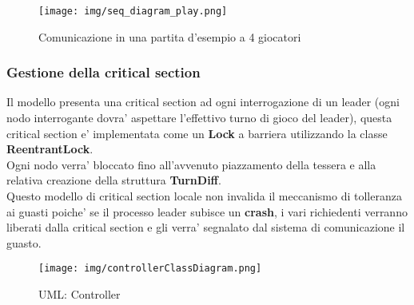 \begin{figure}[H]
	\centering
	\texttt{[image: img/seq\_diagram\_play.png]}
	\caption{Comunicazione in una partita d'esempio a 4 giocatori}
	\label{img:sequence}
\end{figure}

\subsubsection{Gestione della critical section}
	Il modello presenta una critical section ad ogni interrogazione di un leader
	(ogni nodo interrogante dovra' aspettare l'effettivo turno
	di gioco del leader), questa critical section e' implementata come un
	\textbf{Lock} a barriera utilizzando la classe \textbf{ReentrantLock}.\\
	Ogni nodo verra' bloccato fino all'avvenuto piazzamento della tessera e
	alla relativa creazione della struttura \textbf{TurnDiff}.\\
	Questo modello di critical section locale non invalida il meccanismo di
	tolleranza ai guasti poiche' se il processo leader subisce un
	\textbf{crash}, i vari richiedenti verranno liberati dalla critical
	section e gli verra' segnalato dal sistema di comunicazione il guasto.

\begin{figure}[H]
	\centering
	\texttt{[image: img/controllerClassDiagram.png]}
	\caption{UML: Controller}
	\label{img:controller}
\end{figure}

